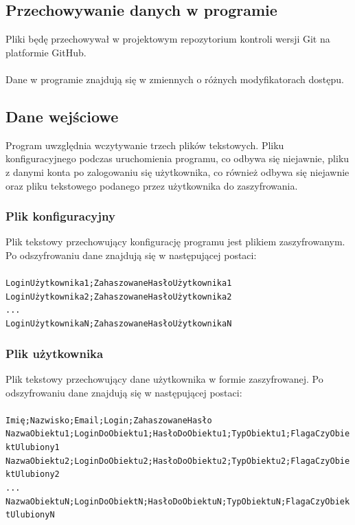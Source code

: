 \documentclass[a4paper]{article}
\newcommand{\prog}{\texttt}
\begin{document}
\subsection{Przechowywanie danych w programie}
Pliki będę przechowywał w projektowym repozytorium kontroli wersji Git na platformie GitHub.\\ \\
Dane w programie znajdują się w zmiennych o różnych modyfikatorach dostępu.

\subsection{Dane wejściowe}
Program uwzględnia wczytywanie trzech plików tekstowych. Pliku konfiguracyjnego podczas uruchomienia programu, co odbywa się niejawnie, pliku z danymi konta po zalogowaniu się użytkownika, co również odbywa się niejawnie oraz pliku tekstowego podanego przez użytkownika do zaszyfrowania.

\subsubsection{Plik konfiguracyjny}\label{pKonf}
Plik tekstowy przechowujący konfigurację programu jest plikiem zaszyfrowanym. Po odszyfrowaniu dane znajdują się w następującej postaci:\\ \\
\prog{LoginUżytkownika1;ZahaszowaneHasłoUżytkownika1\\LoginUżytkownika2;ZahaszowaneHasłoUżytkownika2\\...\\LoginUżytkownikaN;ZahaszowaneHasłoUżytkownikaN}

\subsubsection{Plik użytkownika}\label{pUzy}
Plik tekstowy przechowujący dane użytkownika w formie zaszyfrowanej. Po odszyfrowaniu dane znajdują się w następującej postaci:\\ \\
\prog{Imię;Nazwisko;Email;Login;ZahaszowaneHasło\\NazwaObiektu1;LoginDoObiektu1;HasłoDoObiektu1;TypObiektu1;FlagaCzyObiektUlubiony1\\NazwaObiektu2;LoginDoObiektu2;HasłoDoObiektu2;TypObiektu2;FlagaCzyObiektUlubiony2\\...\\NazwaObiektuN;LoginDoObiektN;HasłoDoObiektuN;TypObiektuN;FlagaCzyObiektUlubionyN}
\end{document}
